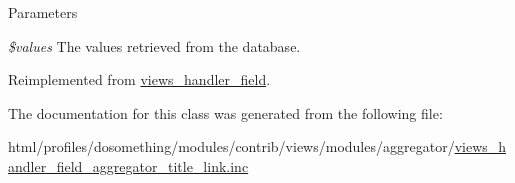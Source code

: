 \begin{DoxyParams}{Parameters}
\item[{\em \$values}]The values retrieved from the database. \end{DoxyParams}


Reimplemented from \hyperlink{classviews__handler__field_a82ff951c5e9ceb97b2eab86f880cbc1e}{views\_\-handler\_\-field}.

The documentation for this class was generated from the following file:\begin{DoxyCompactItemize}
\item 
html/profiles/dosomething/modules/contrib/views/modules/aggregator/\hyperlink{views__handler__field__aggregator__title__link_8inc}{views\_\-handler\_\-field\_\-aggregator\_\-title\_\-link.inc}\end{DoxyCompactItemize}
